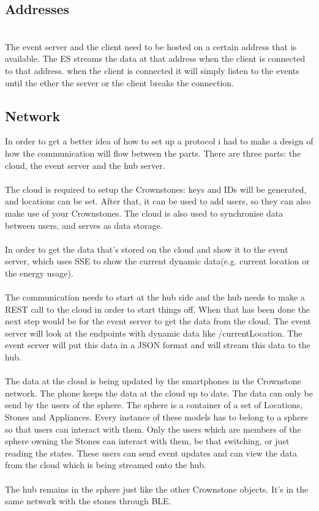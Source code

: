 \documentclass{article}
\begin{document}
\subsection{Addresses}\label{sec:addresses} \\
The event server and the client need to be hosted on a certain address that is available. The ES streams the data at that address when the client is connected to that address. when the client is connected it will simply listen to the events until the ether the server or the client breaks the connection. \\

\cleardoublepage
\subsection{Network}\label{sec:network} 
In order to get a better idea of how to set up a protocol i had to make a design of how the communication will flow between the parts. There are three parts: the cloud, the event server and the hub server. \\
\\
The cloud is required to setup the Crownstones: keys and IDs will be generated, and locations can be set. After that, it can be used to add users, so they can also make use of your Crownstones. The cloud is also used to synchronise data between users, and serves as data storage.\\
\\
In order to get the data that's stored on the cloud and show it to the event server, which uses SSE to show the current dynamic data(e.g. current location or the energy usage).\\
 \\
The communication needs to start at the hub side and the hub needs to make a REST call to the cloud in order to start things off. When that has been done the next step would be for the event server to get the data from the cloud. The event server will look at the endpoints with dynamic data like /currentLocation. The event server will put this data in a JSON format and will stream this data to the hub.\\
\\
The data at the cloud is being updated by the smartphones in the Crownstone network. The phone keeps the data at the cloud up to date.  The  data can only be send by the users of the sphere. The sphere is a container of a set of Locations, Stones and Appliances. Every instance of these models has to belong to a sphere so that users can interact with them. Only the users which are members of the sphere owning the Stones can interact with them, be that switching, or just reading the states. These users can send event updates and can view the data from the cloud which is being streamed onto the hub.\\
\\
The hub remains in the sphere just like the other Crownstone objects. It's in the same network with the stones through BLE. \\
\end{document}

